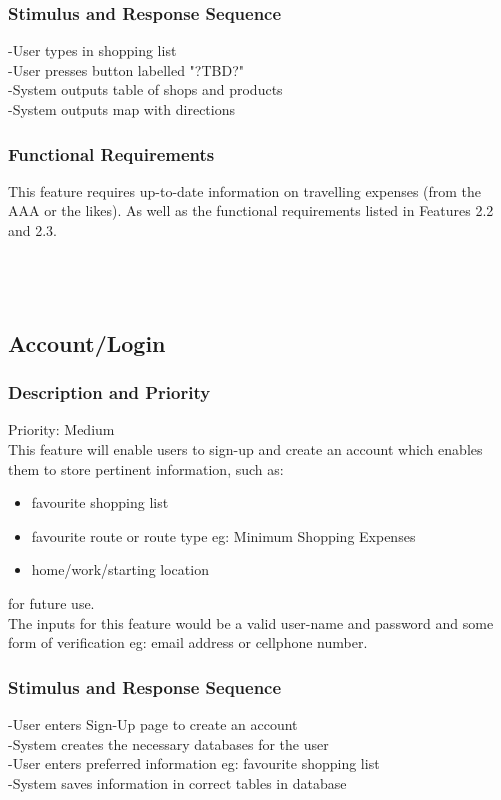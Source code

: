 \documentclass[12pt]{article}
\begin{document}
 \subsubsection{Stimulus and Response Sequence}
 -User types in shopping list\\
-User presses button labelled "?TBD?"\\
-System outputs table of shops and products\\
-System outputs map with directions\\
 \subsubsection{Functional Requirements}
 This feature requires up-to-date information on travelling expenses (from the AAA or the likes).
 As well as the functional requirements listed in Features 2.2 and 2.3.
 \\
 \\
 \\
 \\
 \subsection{Account/Login}
\subsubsection{Description and Priority}
 Priority: Medium\\
 This feature will enable users to sign-up and create an account which enables them to store pertinent information, such as:\begin{itemize}
  \item favourite shopping list
  \item favourite route or route type eg: Minimum Shopping Expenses
  \item home/work/starting location
\end{itemize}
for future use. \\
The inputs for this feature would be a valid user-name and password and some form of verification eg: email address or cellphone number. 
      
 \subsubsection{Stimulus and Response Sequence}
-User enters Sign-Up page to create an account \\
-System creates the necessary databases for the user\\
-User enters preferred information eg: favourite shopping list\\
-System saves information in correct tables in database
\end{document}
